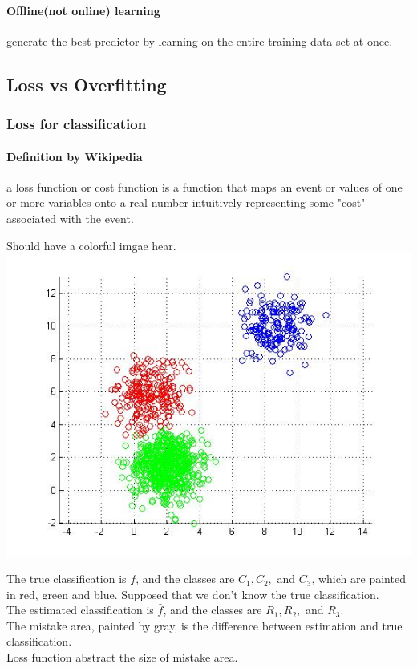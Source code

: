 \documentclass{article}
\begin{document}
{{{        \paragraph{Offline(not online) learning}{
            generate the best predictor by learning on the entire training data set at once.
        }
    }
    \subsection{Loss vs Overfitting}{
        \subsubsection{Loss for classification}{
            \paragraph{Definition by Wikipedia}{
                a loss function or cost function is a function that maps an event or values of one or more variables onto a real number intuitively representing some "cost" associated with the event.
            }

            \begin{center}{
                Should have a colorful imgae hear.
                \includegraphics[scale=0.5]{k-means.jpg}
            }
            \end{center}

            The true classification is $f$, and the classes are $C_1, C_2,$ and $C_3$, which are painted in red, green and blue. Supposed that we don't know the true classification.\\
            The estimated classification is \(\hat{f}\), and the classes are $R_1, R_2,$ and $R_3$.\\
            The mistake area, painted by gray, is the difference between estimation and true classification.\\
            Loss function abstract the size of mistake area.\\

}}}}
\end{document}
